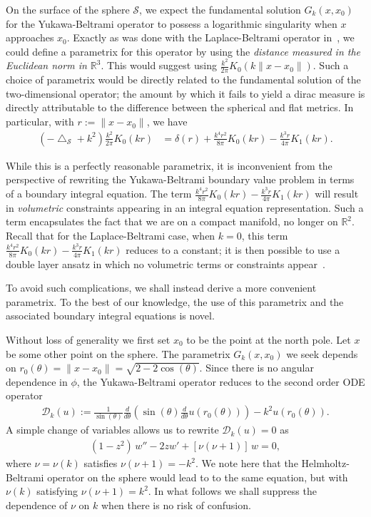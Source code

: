 \documentclass[final]{siamltex}
\newcommand{\lap}{\bigtriangleup}
\renewcommand{\S} {\mathcal{S}}
\begin{document}
On the surface of the sphere $\S$, we expect the fundamental solution
$G_k(x,x_{0})$ for the Yukawa-Beltrami operator to possess a
logarithmic singularity when $x$ approaches $x_{0}$. Exactly as was
done  with the Laplace-Beltrami operator in~\cite{gemmrich}, we could
define a parametrix for this operator by using the {\it distance
measured in the Euclidean norm in $\mathbb{R}^3$}. This would suggest
using $ \frac{k^2}{2\pi}K_0(k\|x-x_{0}\|)$.  Such a choice of
parametrix would be directly related to the fundamental solution of the
two-dimensional operator; the amount by which it fails to yield a dirac
measure is directly attributable to the difference between the
spherical and flat metrics.  In particular, with $r:=\|x-x_{0}\|$, we
have
\begin{align*}
  (-\lap_{\S} + k^{2})\frac{k^2}{2\pi}K_0(kr)&=
    \delta(r) 
    +\frac{k^{4}r^{2}}{8\pi}K_{0}(kr) - \frac{k^{3}r}{4\pi}K_{1}(kr).
\end{align*}

While this is a perfectly reasonable parametrix, it is inconvenient
from the perspective of rewriting the Yukawa-Beltrami boundary value
problem in terms of a boundary integral equation. The term
$\frac{k^{4}r^{2}}{8\pi}K_{0}(kr) - \frac{k^{3}r}{4\pi}K_{1}(kr)$ will
result in {\it volumetric} constraints  appearing in an integral
equation representation. Such a term encapsulates the fact that we are
on a compact manifold, no longer on $\mathbb{R}^2$. Recall that for the
Laplace-Beltrami case, when $k=0$, this term
$\frac{k^{4}r^{2}}{8\pi}K_{0}(kr) - \frac{k^{3}r}{4\pi}K_{1}(kr)$
reduces to a constant; it is then possible to use a double layer ansatz
in which no volumetric terms or constraints appear~\cite{kro:nig2013}.  

To avoid such complications, we shall instead derive a more convenient
parametrix. To the best of our knowledge, the use of this parametrix
and the associated boundary integral equations is novel. 

Without loss of generality we first set $x_{0}$ to be the point at the
north pole.  Let $x$ be some other point on the sphere. The parametrix
$G_k(x,x_0)$ we seek depends on
$r_0(\theta)=\|x-x_0\|=\sqrt{2-2\cos(\theta)}$. Since there is no
angular dependence in $\phi$, the Yukawa-Beltrami operator reduces to
the second order ODE operator
\begin{align*}
\mathcal{D}_k(u):=\frac{1}{\sin(\theta)}\frac{d}{d\theta}\left(\sin(\theta)
\frac{d}{d\theta}u(r_0(\theta))\right)-k^2 u(r_{0}(\theta)).
\end{align*}
A simple change of variables allows us to rewrite $\mathcal{D}_k (u)=0$
as 
\begin{align}
  \label{LegendrePequation}
  (1-z^2)\,w'' -2zw' + \left[\nu(\nu+1)\right]\,w = 0,
\end{align}
where $\nu = \nu(k)$ satisfies $\nu(\nu + 1) = -k^2$. We note here that
the Helmholtz-Beltrami operator on the sphere would lead to to the same
equation, but with $\nu(k)$ satisfying $\nu(\nu+1)=k^{2}$. In what
follows we shall suppress the dependence of $\nu$ on $k$ when there is
no risk of confusion.
\end{document}
